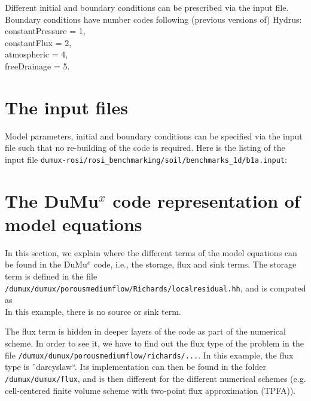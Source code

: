 Different initial and boundary conditions can be prescribed via the input file. Boundary conditions have number codes following (previous versions of) Hydrus: \\
constantPressure = 1,\\
constantFlux = 2, \\
atmospheric = 4, \\
freeDrainage = 5.

\section*{The input files}
Model parameters, initial and boundary conditions can be specified via the input file such that no re-building of the code is required. 
Here is the listing of the input file \lstinline{dumux-rosi/rosi_benchmarking/soil/benchmarks_1d/b1a.input}: 
	

\section*{The DuMu$^x$ code representation of model equations}
In this section, we explain where the different terms of the model equations can be found in the DuMu$^x$ code, i.e., the storage, flux and sink terms. 
The storage term is defined in the file \\
\verb+/dumux/dumux/porousmediumflow/Richards/localresidual.hh+, and is computed as\\
		
In this example, there is no source or sink term. 


The flux term is hidden in deeper layers of the code as part of the numerical scheme. In order to see it, we have to find out the flux type of the problem in the file 
\verb+/dumux/dumux/porousmediumflow/richards/...+. In this example, the flux type is ''darcyslaw``. Its implementation can then be found in the folder \verb+/dumux/dumux/flux+, and is then different for the different numerical schemes (e.g. cell-centered finite volume scheme with two-point flux approximation (TPFA)). 

%	

